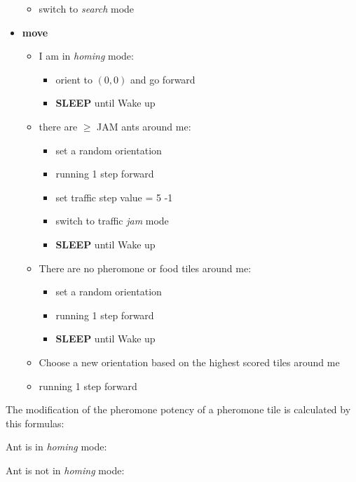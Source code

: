 \begin{itemize}
  \begin{itemize}
  \tightlist
  \item
    switch to \emph{search} mode
  \end{itemize}
\item
  \textbf{move}

  \begin{itemize}
  \tightlist
  \item
    I am in \emph{homing} mode:

    \begin{itemize}
    \tightlist
    \item
      orient to \((0,0)\) and go forward
    \item
      \textbf{SLEEP} until Wake up
    \end{itemize}
  \item
    there are \(\geq\) JAM ants around me:

    \begin{itemize}
    \tightlist
    \item
      set a random orientation
    \item
      running 1 step forward
    \item
      set traffic step value = 5 -1
    \item
      switch to traffic \emph{jam} mode
    \item
      \textbf{SLEEP} until Wake up
    \end{itemize}
  \item
    There are no pheromone or food tiles around me:

    \begin{itemize}
    \tightlist
    \item
      set a random orientation
    \item
      running 1 step forward
    \item
      \textbf{SLEEP} until Wake up
    \end{itemize}
  \item
    Choose a new orientation based on the highest scored tiles around me
  \item
    running 1 step forward
  \end{itemize}
\end{itemize}

The modification of the pheromone potency of a pheromone tile is
calculated by this formulas:

Ant is in \emph{homing} mode:

Ant is not in \emph{homing} mode:

